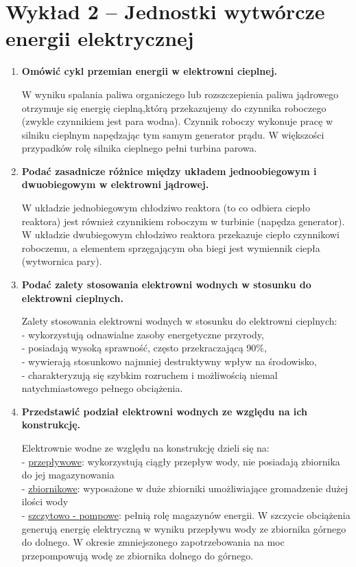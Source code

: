 \documentclass[12pt]{article}
\newcommand{\pytanie}[1]{\item \textbf{#1}}
\begin{document}
\section{Wykład 2 -- Jednostki wytwórcze energii elektrycznej}
\begin{enumerate}
    \pytanie{Omówić cykl przemian energii w elektrowni cieplnej.}

        W wyniku spalania paliwa organiczego lub rozszczepienia paliwa jądrowego otrzymuje się energię cieplną,którą przekazujemy do czynnika roboczego (zwykle czynnikiem jest para wodna). Czynnik roboczy wykonuje pracę w silniku cieplnym napędzając tym samym generator prądu. W większości przypadków rolę silnika cieplnego pełni turbina parowa.

    \pytanie{Podać zasadnicze różnice między układem jednoobiegowym i dwuobiegowym w elektrowni jądrowej.}
    
        W układzie jednobiegowym chłodziwo reaktora (to co odbiera ciepło reaktora) jest również czynnikiem roboczym w turbinie (napędza generator).\\
        W układzie dwubiegowym chłodziwo reaktora przekazuje ciepło czynnikowi roboczemu, a elementem sprzęgającym oba biegi jest wymiennik ciepła (wytwornica pary).

    \pytanie{Podać zalety stosowania elektrowni wodnych w stosunku do elektrowni cieplnych.}

        Zalety stosowania elektrowni wodnych w stosunku do elektrowni cieplnych:\\
        - wykorzystują odnawialne zasoby energetyczne przyrody,\\
        - posiadają wysoką sprawność, często przekraczającą 90\%,\\
        - wywierają stosunkowo najmniej destruktywny wpływ na środowisko,\\
        - charakteryzują się szybkim rozruchem i możliwością niemal natychmiastowego pełnego obciążenia.
    
    \pytanie{Przedstawić podział elektrowni wodnych ze względu na ich konstrukcję.}
    
        Elektrownie wodne ze względu na konstrukcję dzieli się na:\\
        - \underline{przepływowe}: wykorzystują ciągły przepływ wody, nie posiadają zbiornika do jej magazynowania\\
        - \underline{zbiornikowe}: wyposażone w duże zbiorniki umożliwiające gromadzenie dużej ilości wody\\
        - \underline{szczytowo - pompowe}: pełnią rolę magazynów energii. W szczycie obciążenia generują energię elektryczną w wyniku przepływu wody ze zbiornika górnego do dolnego. W okresie zmniejszonego zapotrzebowania na moc przepompowują wodę ze zbiornika dolnego do górnego.


\end{enumerate}
\end{document}
